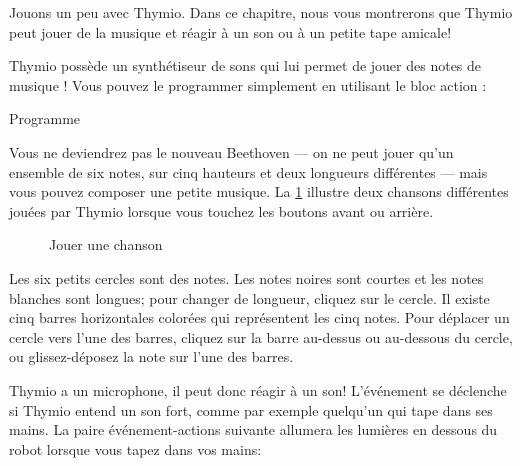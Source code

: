 \label{ch.bells}

Jouons un peu avec Thymio.
Dans ce chapitre, nous vous montrerons que Thymio peut jouer de la musique et réagir à un son ou à un petite tape amicale!


Thymio possède un synthétiseur de sons qui lui permet de jouer des notes de musique !
Vous pouvez le programmer simplement en utilisant le bloc action :

{\raggedleft \hfill Programme }

Vous ne deviendrez pas le nouveau Beethoven --- on ne peut jouer qu'un ensemble de six notes, sur cinq hauteurs et deux longueurs différentes --- mais vous pouvez composer une petite musique.
La \cref{fig.music} illustre deux chansons différentes jouées par Thymio lorsque vous touchez les boutons avant ou arrière.

\begin{figure}
\begin{center}
\caption{Jouer une chanson}\label{fig.music}
\end{center}
\end{figure}

Les six petits cercles sont des notes.
Les notes noires sont courtes et les notes blanches sont
longues; pour changer de longueur, cliquez sur le cercle.
Il existe cinq barres horizontales colorées qui représentent
les cinq notes.
Pour déplacer un cercle vers l'une des barres,
cliquez sur la barre au-dessus ou au-dessous du cercle,
ou glissez-déposez la note sur l'une des barres.




Thymio a un microphone, il peut donc réagir à un son! L'événement  se déclenche si Thymio entend un son fort, comme par exemple quelqu'un qui tape dans ses mains.
La paire événement-actions suivante allumera les lumières en dessous du robot lorsque vous tapez dans vos mains: 

\bigskip

